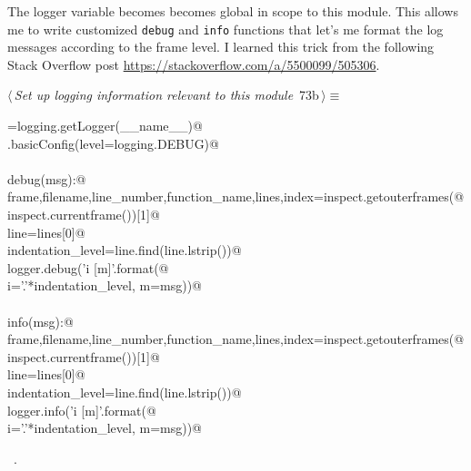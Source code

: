 \documentclass[11.5pt]{report}
\begin{document}
\vspace{-0.8cm}\newchunk The logger variable becomes becomes global in scope to this module. This allows
me to write customized \texttt{debug} and \texttt{info} functions that let's me format 
the log messages according to the frame level. I learned this trick from the following 
Stack Overflow post \url{https://stackoverflow.com/a/5500099/505306}. 
\begin{flushleft} \small
\begin{minipage}{\linewidth}\label{scrap101}\raggedright\small
{} $\langle\,${\itshape Set up logging information relevant to this module}\nobreak\ {\footnotesize {73b}}$\,\rangle\equiv$
\vspace{-1ex}
\begin{list}{}{} \item
\mbox{}\verb@logger=logging.getLogger(__name__)@\\
\mbox{}\verb@logging.basicConfig(level=logging.DEBUG)@\\
\mbox{}\verb@@\\
\mbox{}\verb@def debug(msg):@\\
\mbox{}\verb@    frame,filename,line_number,function_name,lines,index=inspect.getouterframes(@\\
\mbox{}\verb@        inspect.currentframe())[1]@\\
\mbox{}\verb@    line=lines[0]@\\
\mbox{}\verb@    indentation_level=line.find(line.lstrip())@\\
\mbox{}\verb@    logger.debug('{i} [{m}]'.format(@\\
\mbox{}\verb@        i='.'*indentation_level, m=msg))@\\
\mbox{}\verb@@\\
\mbox{}\verb@def info(msg):@\\
\mbox{}\verb@    frame,filename,line_number,function_name,lines,index=inspect.getouterframes(@\\
\mbox{}\verb@        inspect.currentframe())[1]@\\
\mbox{}\verb@    line=lines[0]@\\
\mbox{}\verb@    indentation_level=line.find(line.lstrip())@\\
\mbox{}\verb@    logger.info('{i} [{m}]'.format(@\\
\mbox{}\verb@        i='.'*indentation_level, m=msg))@\\
\mbox{}\verb@@{\NWsep}
\end{list}
\vspace{-1.5ex}
\footnotesize
\begin{list}{}{\setlength{\itemsep}{-\parsep}\setlength{\itemindent}{-\leftmargin}}
\item \NWtxtMacroRefIn\ .

\item{}
\end{list}
\end{minipage}\vspace{4ex}
\end{flushleft}
\end{document}

